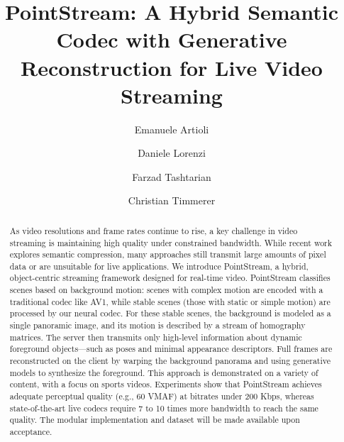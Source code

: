 \documentclass[manuscript, screen]{acmart}
\begin{document}
\title[PointStream]{PointStream: A Hybrid Semantic Codec with Generative Reconstruction for Live Video Streaming}

\author{Emanuele Artioli}
\author{Daniele Lorenzi}
\author{Farzad Tashtarian}
\author{Christian Timmerer}

\begin{abstract}
As video resolutions and frame rates continue to rise, a key challenge in video streaming is maintaining high quality under constrained bandwidth. While recent work explores semantic compression, many approaches still transmit large amounts of pixel data or are unsuitable for live applications. We introduce PointStream, a hybrid, object-centric streaming framework designed for real-time video. PointStream classifies scenes based on background motion: scenes with complex motion are encoded with a traditional codec like AV1, while stable scenes (those with static or simple motion) are processed by our neural codec. For these stable scenes, the background is modeled as a single panoramic image, and its motion is described by a stream of homography matrices. The server then transmits only high-level information about dynamic foreground objects—such as poses and minimal appearance descriptors. Full frames are reconstructed on the client by warping the background panorama and using generative models to synthesize the foreground. This approach is demonstrated on a variety of content, with a focus on sports videos. Experiments show that PointStream achieves adequate perceptual quality (e.g., 60 VMAF) at bitrates under 200 Kbps, whereas state-of-the-art live codecs require 7 to 10 times more bandwidth to reach the same quality. The modular implementation and dataset will be made available upon acceptance.
\end{abstract}

\renewcommand{\shortauthors}{Emanuele Artioli, et al.}
\end{document}
